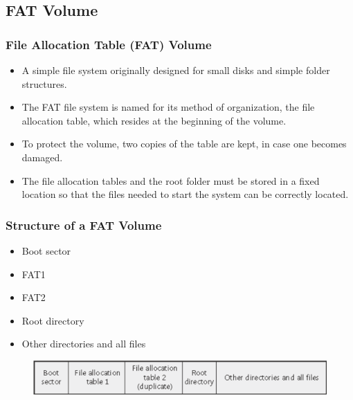 \subsection{FAT Volume} %
\begin{frame}[fragile]
    \frametitle{File Allocation Table (FAT) Volume}
\begin{itemize}
    \item A simple file system originally {\color{red}designed for small disks and simple folder structures}. 
    \item The FAT file system is named for its method of organization, the {\color{red}file allocation table}, which resides at the beginning of the volume.
    \item To protect the volume, two copies of the table are kept, in case one becomes damaged.
    \item {\color{red}The file allocation tables and the root folder must be stored in a fixed location} so that the files needed to start the system can be correctly located.
\end{itemize}
\end{frame}
% 
% 
% 
% 
\begin{frame}[fragile]
    \frametitle{Structure of a FAT Volume}
    \begin{itemize}
        \item Boot sector
        \item FAT1
        \item FAT2
        \item Root directory
        \item Other directories and all files
    \end{itemize}

    \begin{figure}
    \includegraphics[width=1.0\linewidth]{figs/FAT-volume.png}
    \end{figure}
\end{frame}
